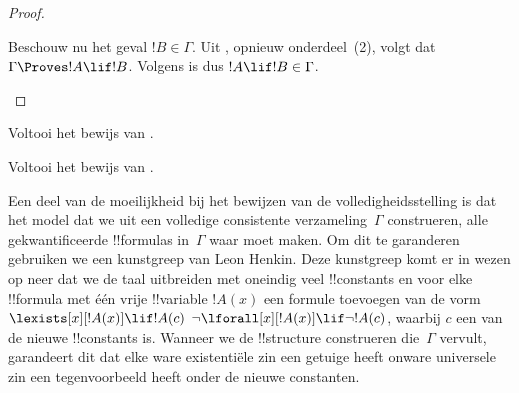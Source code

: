 \documentclass[openany]{memoir}
\begin{document}
\begin{proof}
\begin{enumerate}
{{Beschouw nu het geval $!B \in \Gamma$. Uit
,
opnieuw onderdeel~(2), volgt dat $\Gamma \Proves !A \lif !B$. Volgens
 is dus $!A \lif !B \in \Gamma$.}}
\end{enumerate}
\end{proof}

\begin{prob}
Voltooi het bewijs van .
\end{prob}
\tagendprob

\begin{prob}
Voltooi het bewijs van .
\end{prob}
\tagendprob
\endgroup

\begingroup
\def\olfilename{OLP-0130}
\def\olfilepath{content/first-order-logic/completeness/}
\hypertarget{unit-OLP-0130}{}





\begin{explain}
Een deel van de moeilijkheid bij het bewijzen van de volledigheidsstelling
is dat het model dat we uit een volledige consistente verzameling~$\Gamma$
construeren, alle gekwantificeerde !!{formula}s in~$\Gamma$ waar moet
maken. Om dit te garanderen gebruiken we een kunstgreep van Leon Henkin.
Deze kunstgreep komt er in wezen op neer dat we de taal uitbreiden met
oneindig veel !!{constant}s en voor elke !!{formula} met één vrije
!!{variable} $!A(x)$ een formule toevoegen van de vorm
      {$\lexists[x][!A(x)] \lif !A(c)$}
      {$\lnot\lforall[x][!A(x)] \lif \lnot !A(c)$},
waarbij $c$ een van de nieuwe !!{constant}s is. Wanneer we de
!!{structure} construeren die~$\Gamma$ vervult, garandeert dit dat elke
{ware existentiële zin een getuige heeft}
{onware universele zin een tegenvoorbeeld heeft}
onder de nieuwe constanten.
\end{explain}
\end{document}
